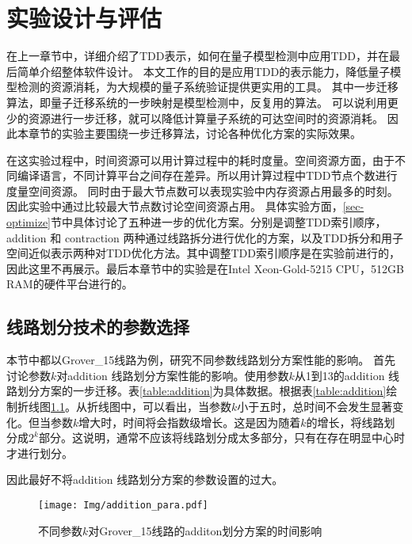 \chapter{实验设计与评估}
在上一章节中，详细介绍了TDD表示，如何在量子模型检测中应用TDD，并在最后简单介绍整体软件设计。
本文工作的目的是应用TDD的表示能力，降低量子模型检测的资源消耗，为大规模的量子系统验证提供更实用的工具。
其中一步迁移算法，即量子迁移系统的一步映射是模型检测中，反复用的算法。
可以说利用更少的资源进行一步迁移，就可以降低计算量子系统的可达空间时的资源消耗。
因此本章节的实验主要围绕一步迁移算法，讨论各种优化方案的实际效果。

在这实验过程中，时间资源可以用计算过程中的耗时度量。空间资源方面，由于不同编译语言，不同计算平台之间存在差异。所以用计算过程中TDD节点个数进行度量空间资源。
同时由于最大节点数可以表现实验中内存资源占用最多的时刻。因此实验中通过比较最大节点数讨论空间资源占用。
具体实验方面，\ref{sec-optimize}节中具体讨论了五种进一步的优化方案。分别是调整TDD索引顺序，addition 和 contraction 两种通过线路拆分进行优化的方案，以及TDD拆分和用子空间近似表示两种对TDD优化方法。其中调整TDD索引顺序是在实验前进行的，因此这里不再展示。最后本章节中的实验是在Intel Xeon-Gold-5215 CPU，512GB RAM的硬件平台进行的。
\section{线路划分技术的参数选择}
\label{sec-para}
本节中都以Grover\_15线路为例，研究不同参数线路划分方案性能的影响。
首先讨论参数$k$对addition 线路划分方案性能的影响。使用参数$k$从1到13的addition 线路划分方案的一步迁移。表\ref{table:addition}为具体数据。根据表\ref{table:addition}绘制折线图\ref{fig:addition-ex}。从折线图中，可以看出，当参数$k$小于五时，总时间不会发生显著变化。但当参数$k$增大时，时间将会指数级增长。这是因为随着$k$的增长，将线路划分成$2^k$部分。这说明，通常不应该将线路划分成太多部分，只有在存在明显中心时才进行划分。

因此最好不将addition 线路划分方案的参数设置的过大。
\begin{figure}
    \centering
    \texttt{[image: Img/addition\_para.pdf]}
    \caption{不同参数$k$对Grover\_15线路的additon划分方案的时间影响}
    \label{fig:addition-ex}
\end{figure}
\begin{table}[htbp]
    \centering
    \caption{对grover\_15应用不同的addition参数的时间对比}
    \label{table:addition}
\end{table}


